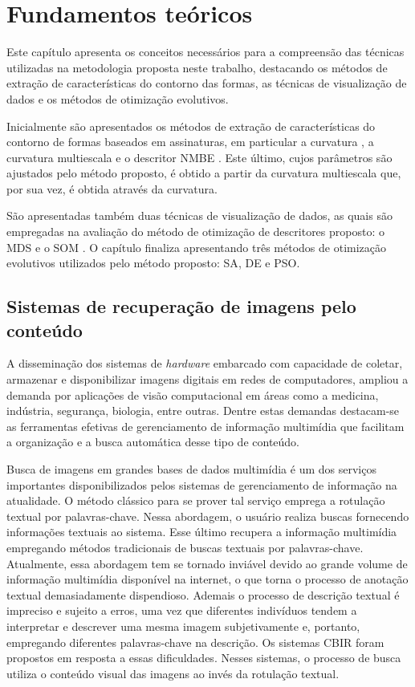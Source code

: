 
\chapter{Fundamentos teóricos\label{chap:FUNDA}}

Este capítulo apresenta os conceitos necessários para a compreensão das técnicas utilizadas na metodologia proposta neste trabalho, destacando os métodos de extração de características do contorno das formas, as técnicas de visualização de dados e os métodos de otimização evolutivos.

Inicialmente são apresentados os métodos de extração de características do contorno de formas baseados em assinaturas, em particular a curvatura \cite{Kindratenko:2003}, a curvatura multiescala \cite{149591} e o descritor \ac{NMBE} \cite{Costa:1997}. Este último, cujos parâmetros são ajustados pelo método proposto, é obtido a partir da curvatura multiescala que, por sua vez, é obtida através da curvatura.

São apresentadas também duas técnicas de visualização de dados, as quais são empregadas na avaliação do método de otimização de descritores proposto: o \ac{MDS} \cite{cox:2000} e o \ac{SOM} \cite{Kohonen:2001}. O capítulo finaliza apresentando três métodos de otimização evolutivos utilizados pelo método proposto: \ac{SA}, \ac{DE} e \ac{PSO}. 

\section{\label{chap:CBIR} Sistemas de recuperação de imagens pelo conteúdo}

A disseminação dos sistemas de \textit{hardware} embarcado com capacidade de coletar, armazenar e disponibilizar imagens digitais em redes de computadores, ampliou a demanda por aplicações de visão computacional em áreas como a medicina, indústria, segurança, biologia, entre outras. Dentre estas  demandas destacam-se as ferramentas efetivas de gerenciamento de informação multimídia que facilitam a organização e a busca automática desse tipo de conteúdo. 

Busca de imagens em grandes bases de dados multimídia é um dos serviços importantes disponibilizados pelos sistemas de gerenciamento de informação na atualidade. O método clássico para se prover tal serviço emprega a rotulação textual por palavras-chave. Nessa abordagem, o usuário realiza buscas fornecendo informações textuais ao sistema. Esse último recupera a informação multimídia empregando métodos tradicionais de buscas textuais por palavras-chave. Atualmente, essa abordagem tem se tornado inviável devido ao grande volume de informação multimídia disponível na internet, o que torna o processo de anotação textual demasiadamente dispendioso. Ademais o processo de descrição textual é impreciso e sujeito a erros, uma vez que diferentes indivíduos tendem a interpretar e descrever uma mesma imagem subjetivamente e, portanto, empregando diferentes palavras-chave na descrição. Os sistemas  \ac{CBIR} foram propostos em resposta a essas dificuldades. Nesses sistemas, o processo de busca utiliza o conteúdo visual das imagens ao invés da rotulação textual. 

